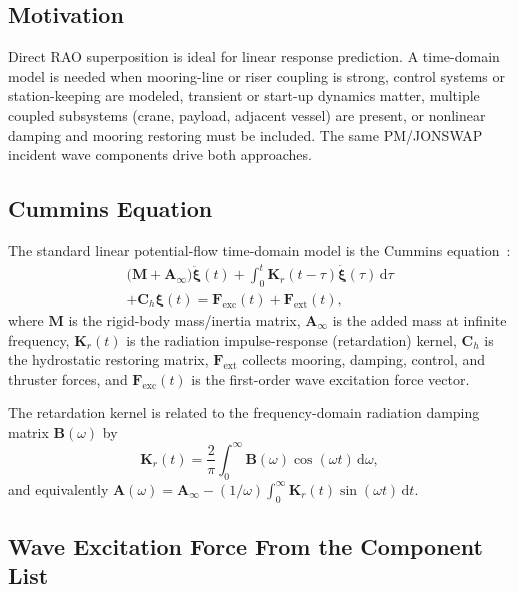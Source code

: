 \documentclass[journal,10pt,twocolumn]{IEEEtran}
\newcommand{\dd}{\,\mathrm{d}}
\newcommand{\vect}[1]{\bm{#1}}
\begin{document}
    \subsection{Motivation}
    \label{sec:cummins_why}

    Direct RAO superposition is ideal for linear response prediction.
    A time-domain model is needed when mooring-line or riser coupling is strong, control
    systems or station-keeping are modeled, transient or start-up dynamics matter, multiple
    coupled subsystems (crane, payload, adjacent vessel) are present, or nonlinear damping
    and mooring restoring must be included.
    The same PM/JONSWAP incident wave components drive both approaches.

    \subsection{Cummins Equation}
    \label{sec:cummins_eq}

    The standard linear potential-flow time-domain model is the Cummins equation~\cite{Cummins}:
    \begin{multline}
        \bigl(\vect{M}+\vect{A}_\infty\bigr)\ddot{\vect{\xi}}(t)
        + \int_0^t \vect{K}_r(t-\tau)\dot{\vect{\xi}}(\tau)\dd\tau \\
        + \vect{C}_h\vect{\xi}(t)
        = \vect{F}_{\mathrm{exc}}(t) + \vect{F}_{\mathrm{ext}}(t),
        \label{eq:cummins}
    \end{multline}
    where $\vect{M}$ is the rigid-body mass/inertia matrix, $\vect{A}_\infty$ is the
    added mass at infinite frequency, $\vect{K}_r(t)$ is the radiation impulse-response
    (retardation) kernel, $\vect{C}_h$ is the hydrostatic restoring matrix,
    $\vect{F}_{\mathrm{ext}}$ collects mooring, damping, control, and thruster forces,
    and $\vect{F}_{\mathrm{exc}}(t)$ is the first-order wave excitation force vector.

    The retardation kernel is related to the frequency-domain radiation damping matrix
    $\vect{B}(\omega)$ by
    \begin{equation}
        \vect{K}_r(t)
        = \frac{2}{\pi}\int_0^\infty \vect{B}(\omega)\cos(\omega t)\dd\omega,
        \label{eq:retardation}
    \end{equation}
    and equivalently $\vect{A}(\omega) = \vect{A}_\infty
    - (1/\omega)\int_0^\infty \vect{K}_r(t)\sin(\omega t)\dd t$.

    \subsection{Wave Excitation Force From the Component List}
    \label{sec:excitation}
\end{document}
